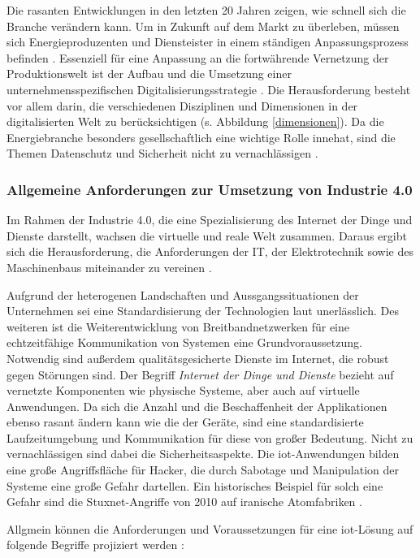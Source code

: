 \noindent Die rasanten Entwicklungen in den letzten 20 Jahren zeigen, wie schnell sich die Branche verändern kann. Um in Zukunft auf dem Markt zu überleben, müssen sich Energieproduzenten und Diensteister in einem ständigen Anpassungsprozess befinden \citep{Doleski2015}. Essenziell für eine Anpassung an die fortwährende Vernetzung der Produktionswelt ist der Aufbau und die Umsetzung einer unternehmensspezifischen Digitalisierungsstrategie \citep{Koester2017}. Die Herausforderung besteht vor allem darin, die verschiedenen Disziplinen und Dimensionen in der digitalisierten Welt zu berücksichtigen (s. Abbildung \ref{dimensionen}).  Da die Energiebranche besonders gesellschaftlich eine wichtige Rolle innehat, sind die Themen Datenschutz und Sicherheit nicht zu vernachlässigen \citep{Utecht2018}.


\subsubsection{Allgemeine Anforderungen zur Umsetzung von Industrie 4.0}\label{general}

Im Rahmen der Industrie 4.0, die eine Spezialisierung des Internet der Dinge und Dienste darstellt, wachsen die virtuelle und reale Welt zusammen. Daraus ergibt sich die Herausforderung, die Anforderungen der IT, der Elektrotechnik sowie des Maschinenbaus miteinander zu vereinen \citep{Huebner2017}.

Aufgrund der heterogenen Landschaften und Aussgangssituationen der Unternehmen sei eine Standardisierung der Technologien laut \citet{Bauer2014} unerlässlich. Des weiteren ist die Weiterentwicklung von Breitbandnetzwerken für eine echtzeitfähige Kommunikation von Systemen eine Grundvoraussetzung. Notwendig sind außerdem qualitätsgesicherte Dienste im Internet, die robust gegen Störungen sind. Der Begriff \textit{Internet der Dinge und Dienste} bezieht auf vernetzte Komponenten wie physische Systeme, aber auch auf virtuelle Anwendungen. Da sich die Anzahl und die Beschaffenheit der Applikationen ebenso rasant ändern kann wie die der Geräte, sind eine standardisierte Laufzeitumgebung und Kommunikation für diese von großer Bedeutung. Nicht zu vernachlässigen sind dabei die Sicherheitsaspekte. Die \ac{iot}-Anwendungen bilden eine große Angriffsfläche für Hacker, die durch Sabotage und Manipulation der Systeme eine große Gefahr dartellen. Ein historisches Beispiel für solch eine Gefahr sind die Stuxnet-Angriffe von 2010 auf iranische Atomfabriken \citep{Bauer2014}.

Allgmein können die Anforderungen und Voraussetzungen für eine \ac{iot}-Lösung auf folgende Begriffe projiziert werden \citep{Acharya2019}:

